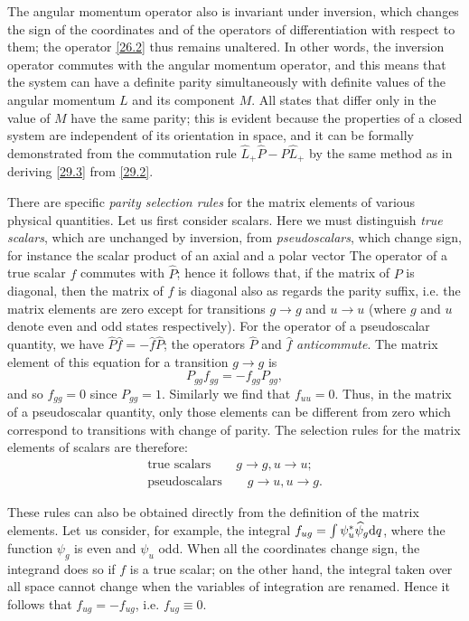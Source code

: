 The angular momentum operator also is invariant under inversion, which changes the sign of the coordinates and of the operators of differentiation with respect to them; the operator \eqref{26.2} thus remains unaltered. In other words, the inversion operator commutes with the angular momentum operator, and this means that the system can have a definite parity simultaneously with definite values of the angular momentum $ L $ and its component $ M $. All states that differ only in the value of $ M $ have the same parity; this is evident because the properties of a closed system are independent of its orientation in space, and it can be formally demonstrated from the commutation rule $ \hat{L}_+\hat{P}-\hat{P}\hat{L}_+ $ by the same method as in deriving \eqref{29.3} from \eqref{29.2}.

There are specific \textit{parity selection rules} for the matrix elements of various physical quantities. Let us first consider scalars. Here we must distinguish \textit{true scalars}, which are unchanged by inversion, from \textit{pseudoscalars}, which change sign, for instance the scalar product of an axial and a polar vector The operator of a true scalar $ f $ commutes with $\hat{P}$; hence it follows that, if the matrix of $ P $ is diagonal, then the matrix of $ f $ is diagonal also as regards the parity suffix, i.e. the matrix elements are zero except for transitions $ g \to g $ and $ u \to u $ (where $ g $ and $ u $ denote even and odd states respectively). For the operator of a pseudoscalar quantity, we have $ \hat{P}\hat{f}=-\hat{f}\hat{P} $; the operators $ \hat{P} $ and $\hat{f}$ \textit{anticommute}. The matrix element of this equation for a transition $ g \to g $ is \[ P_{gg}f_{gg} = - f_{gg}P_{gg}, \] and so $ f_{gg} = 0 $ since $ P_{gg} = 1 $. Similarly we find that $ f_{uu} = 0 $. Thus, in the matrix of a pseudoscalar quantity, only those elements can be different from zero which correspond to transitions with change of parity. The selection rules for the matrix elements of scalars are therefore:
\begin{equation}\label{30.4}
\begin{split}
\text{true scalars}\qquad g\to g,u\to u;\\
\text{pseudoscalars}\qquad g\to u,u\to g.
\end{split}
\end{equation}



These rules can also be obtained directly from the definition of the matrix elements. Let us consider, for example, the integral $ f_{ug}=\int\psi_u^*\widehat\psi_g\mathrm{d} q $, where the function $\psi_g$ is even and $\psi_u$ odd. When all the coordinates change sign, the integrand does so if $ f $ is a true scalar; on the other hand, the integral taken over all space cannot change when the variables of integration are renamed. Hence it follows that $ f_{ug} = - f_{ug} $, i.e. $ f_{ug} \equiv 0 $.

